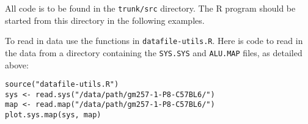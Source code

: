 \documentclass{article}
\begin{document}
All code is to be found in the \texttt{trunk/src} directory. The R
program should be started from this directory in the following examples.

To read in data use the functions in \texttt{datafile-utils.R}. Here
is code to read in the data from a directory containing the
\texttt{SYS.SYS} and \texttt{ALU.MAP} files, as detailed above:
\begin{verbatim}
source("datafile-utils.R")
sys <- read.sys("/data/path/gm257-1-P8-C57BL6/")
map <- read.map("/data/path/gm257-1-P8-C57BL6/")
plot.sys.map(sys, map)
\end{verbatim}
\end{document}
